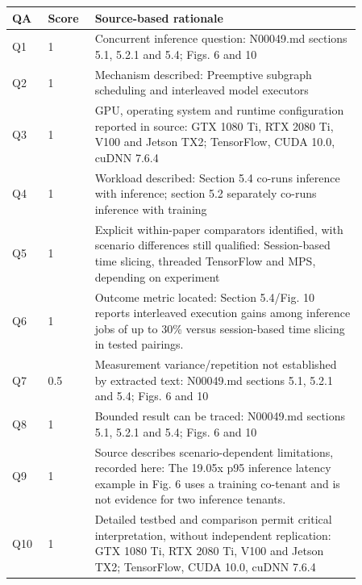 \begin{longtable}{P{0.09\linewidth}P{0.10\linewidth}P{0.67\linewidth}}
\toprule QA & Score & Source-based rationale\\\midrule\endhead
Q1 & 1 & Concurrent inference question: N00049.md sections 5.1, 5.2.1 and 5.4; Figs. 6 and 10\\
Q2 & 1 & Mechanism described: Preemptive subgraph scheduling and interleaved model executors\\
Q3 & 1 & GPU, operating system and runtime configuration reported in source: GTX 1080 Ti, RTX 2080 Ti, V100 and Jetson TX2; TensorFlow, CUDA 10.0, cuDNN 7.6.4\\
Q4 & 1 & Workload described: Section 5.4 co-runs inference with inference; section 5.2 separately co-runs inference with training\\
Q5 & 1 & Explicit within-paper comparators identified, with scenario differences still qualified: Session-based time slicing, threaded TensorFlow and MPS, depending on experiment\\
Q6 & 1 & Outcome metric located: Section 5.4/Fig. 10 reports interleaved execution gains among inference jobs of up to 30\% versus session-based time slicing in tested pairings.\\
Q7 & 0.5 & Measurement variance/repetition not established by extracted text: N00049.md sections 5.1, 5.2.1 and 5.4; Figs. 6 and 10\\
Q8 & 1 & Bounded result can be traced: N00049.md sections 5.1, 5.2.1 and 5.4; Figs. 6 and 10\\
Q9 & 1 & Source describes scenario-dependent limitations, recorded here: The 19.05x p95 inference latency example in Fig. 6 uses a training co-tenant and is not evidence for two inference tenants.\\
Q10 & 1 & Detailed testbed and comparison permit critical interpretation, without independent replication: GTX 1080 Ti, RTX 2080 Ti, V100 and Jetson TX2; TensorFlow, CUDA 10.0, cuDNN 7.6.4\\
\bottomrule\end{longtable}

